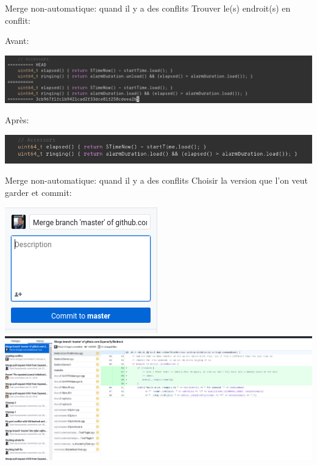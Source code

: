 \documentclass{beamer}
\begin{document}
\begin{frame}{Merge non-automatique: quand il y a des conflits}
    Trouver le(s) endroit(s) en conflit:

    Avant: 
    \begin{center}
        \includegraphics[width=\textwidth]{img/github_desktop/merge_before.png}
    \end{center}

    Après:
    \begin{center}
        \includegraphics[width=\textwidth]{img/github_desktop/merge_after.png}
    \end{center}
\end{frame}

\begin{frame}{Merge non-automatique: quand il y a des conflits}
    Choisir la version que l'on veut garder et commit:\\
    \begin{center}
        \includegraphics[width=.3\textwidth]{img/github_desktop/conflit_4.png}\\
        \includegraphics[width=.95\textwidth]{img/github_desktop/conflit_5.png}
    \end{center}
\end{frame}
\end{document}
